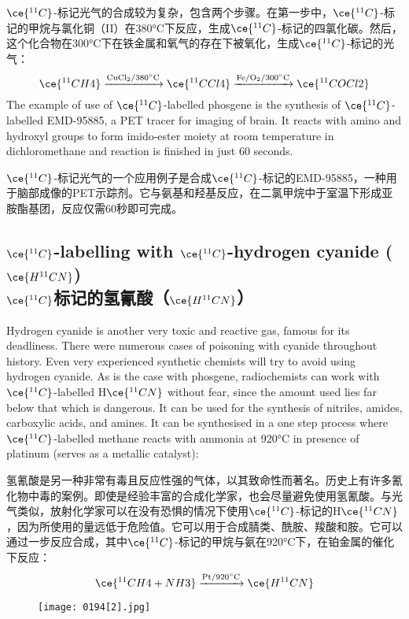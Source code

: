 \documentclass[dvipsnames, svgnames,a4paper,11pt]{article}
\begin{document}
\(\ce{^{11}C}\)-标记光气的合成较为复杂，包含两个步骤。在第一步中，\(\ce{^{11}C}\)-标记的甲烷与氯化铜（II）在380°C下反应，生成\(\ce{^{11}C}\)-标记的四氯化碳。然后，这个化合物在300°C下在铁金属和氧气的存在下被氧化，生成\(\ce{^{11}C}\)-标记的光气：  
\[
\ce{^{11}CH4} \xrightarrow{\mathrm{CuCl_2/380^\circ C}} \ce{^{11}CCl4}   \xrightarrow{\mathrm{Fe/O_2/300^\circ C}} \ce{^{11}COCl2}
\]
The example of use of \(\ce{^{11}C}\)-labelled phosgene is the synthesis of \(\ce{^{11}C}\)-labelled EMD-95885, a PET tracer for imaging of brain. It reacts with amino and hydroxyl groups to form imido-ester moiety at room temperature in dichloromethane and reaction is finished in just 60 seconds.

\(\ce{^{11}C}\)-标记光气的一个应用例子是合成\(\ce{^{11}C}\)-标记的EMD-95885，一种用于脑部成像的PET示踪剂。它与氨基和羟基反应，在二氯甲烷中于室温下形成亚胺酯基团，反应仅需60秒即可完成。




\subsection{\(\ce{^{11}C}\)-labelling with \(\ce{^{11}C}\)-hydrogen cyanide (\(\ce{H^{11}CN}\)) \\ \(\ce{^{11}C}\)标记的氢氰酸（\(\ce{H^{11}CN}\)）}  
Hydrogen cyanide is another very toxic and reactive gas, famous for its deadliness. There were numerous cases of poisoning with cyanide throughout history. Even very experienced synthetic chemists will try to avoid using hydrogen cyanide. As is the case with phosgene, radiochemists can work with \(\ce{^{11}C}\)-labelled H\(\ce{^{11}CN}\) without fear, since the amount used lies far below that which is dangerous. It can be used for the synthesis of nitriles, amides, carboxylic acids, and amines. It can be synthesised in a one step process where \(\ce{^{11}C}\)-labelled methane reacts with ammonia at 920°C in presence of platinum (serves as a metallic catalyst): 

氢氰酸是另一种非常有毒且反应性强的气体，以其致命性而著名。历史上有许多氰化物中毒的案例。即使是经验丰富的合成化学家，也会尽量避免使用氢氰酸。与光气类似，放射化学家可以在没有恐惧的情况下使用\(\ce{^{11}C}\)-标记的H\(\ce{^{11}CN}\)，因为所使用的量远低于危险值。它可以用于合成腈类、酰胺、羧酸和胺。它可以通过一步反应合成，其中\(\ce{^{11}C}\)-标记的甲烷与氨在920°C下，在铂金属的催化下反应：  
\[
\ce{^{11}CH4 + NH3} \xrightarrow{\mathrm{Pt/920^\circ C}} \ce{H^{11}CN}
\]

\begin{figure}[h]
	\centering
    \texttt{[image: 0194[2].jpg]}  
     \label{fig230}
\end{figure}
\end{document}

